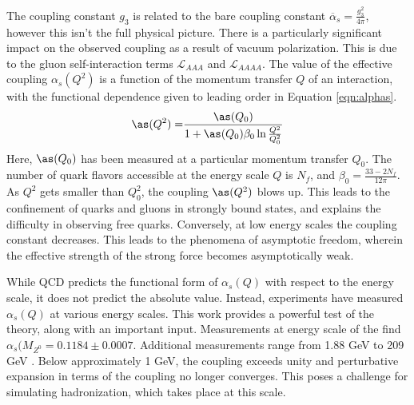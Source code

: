 The coupling constant $g_3$ is related to the bare coupling constant $\overline{\alpha}_s=\frac{g^2_3}{4\pi}$, however this isn't the full physical picture.
There is a particularly significant impact on the observed coupling as a result of vacuum polarization.
This is due to the gluon self-interaction terms $\mathcal{L}_{AAA}$ and $\mathcal{L}_{AAAA}$.
The value of the effective coupling $\alpha_s(Q^2)$ is a function of the momentum transfer $Q$ of an interaction, with the functional dependence given to leading order in Equation \ref{eqn:alphas}.
\begin{equation}\begin{split}\label{eqn:alphas}
    \as(Q^2)=&\frac{\as(Q_0)}{1+\as(Q_0)\beta_0\ln\frac{Q^2}{Q_0^2}} \\
\end{split}\end{equation} 
Here, $\as(Q_0)$ has been measured at a particular momentum transfer $Q_0$.
The number of quark flavors accessible at the energy scale $Q$ is $N_f$, and $\beta_0=\frac{33-2N_f}{12\pi}$.
As $Q^2$ gets smaller than $Q_0^2$, the coupling $\as(Q^2)$ blows up.
This leads to the confinement of quarks and gluons in strongly bound states, and explains the difficulty in observing free quarks.
Conversely, at low energy scales the coupling constant decreases.
This leads to the phenomena of asymptotic freedom, wherein the effective strength of the strong force becomes asymptotically weak.

While QCD predicts the functional form of $\alpha_s(Q)$ with respect to the energy scale, it does not predict the absolute value.
Instead, experiments have measured $\alpha_s(Q)$ at various energy scales.
This work provides a powerful test of the theory, along with an important input.
Measurements at energy scale of the \Z find $\alpha_s(M_{Z^0}=0.1184\pm0.0007$.
Additional measurements range from 1.88 GeV to 209 GeV \cite{bethke}.
Below approximately 1 GeV, the coupling exceeds unity and perturbative expansion in terms of the coupling no longer converges.
This poses a challenge for simulating hadronization, which takes place at this scale.

